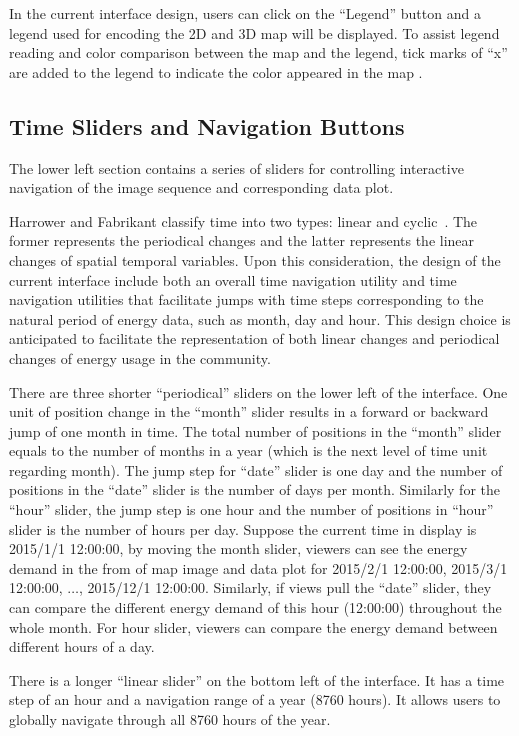 In the current interface design, users can click on the ``Legend''
button and a legend used for encoding the 2D and 3D map will be
displayed. To assist legend reading and color comparison between the
map and the legend, tick marks of ``x'' are added to the legend to
indicate the color appeared in the map .

\subsection{Time Sliders and Navigation Buttons}
The lower left section contains a series of sliders for controlling
interactive navigation of the image sequence and corresponding data
plot. 

Harrower and Fabrikant classify time into two types: linear and
cyclic~\cite{Harrower2008}. The former represents the periodical
changes and the latter represents the linear changes of spatial
temporal variables. Upon this consideration, the design of the current
interface include both an overall time navigation utility and time
navigation utilities that facilitate jumps with time steps
corresponding to the natural period of energy data, such as month, day
and hour. This design choice is anticipated to facilitate the
representation of both linear changes and periodical changes of energy
usage in the community.

There are three shorter ``periodical'' sliders on the lower left of
the interface. One unit of position change in the ``month'' slider
results in a forward or backward jump of one month in time. The total
number of positions in the ``month'' slider equals to the number of
months in a year (which is the next level of time unit regarding
month).  The jump step for ``date'' slider is one day and the number
of positions in the ``date'' slider is the number of days per
month. Similarly for the ``hour'' slider, the jump step is one hour
and the number of positions in ``hour'' slider is the number of hours
per day. Suppose the current time in display is 2015/1/1 12:00:00, by
moving the month slider, viewers can see the energy demand in the from
of map image and data plot for 2015/2/1 12:00:00, 2015/3/1 12:00:00,
$\dots$, 2015/12/1 12:00:00. Similarly, if views pull the ``date''
slider, they can compare the different energy demand of this hour
(12:00:00) throughout the whole month. For hour slider, viewers can
compare the energy demand between different hours of a day.

There is a longer ``linear slider'' on the bottom left of the
interface. It has a time step of an hour and a navigation range of a
year (8760 hours). It allows users to globally navigate through all
8760 hours of the year.

